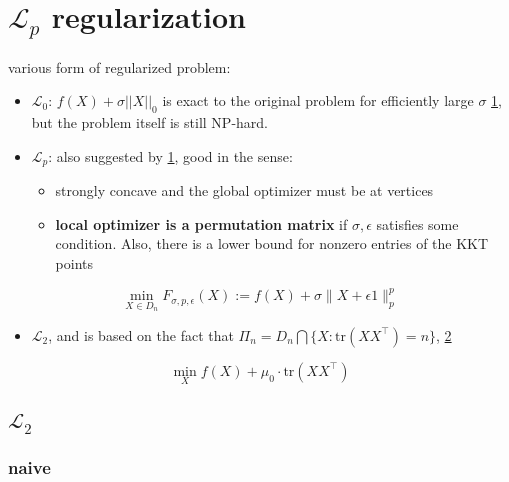 \documentclass[
  10pt,
  a4paper,
,tablecaptionabove
]{scrartcl}
\providecommand{\tightlist}{%
  \setlength{\itemsep}{0pt}\setlength{\parskip}{0pt}}
\begin{document}
\hypertarget{mathscr-l_p-regularization}{%
\section{\texorpdfstring{\(\mathscr L_p\)
regularization}{\textbackslash mathscr L\_p regularization}}\label{mathscr-l_p-regularization}}

various form of regularized problem:

\begin{itemize}
\item
  \(\mathscr L_0\): \(f(X) + \sigma ||X||_0\) is exact to the original
  problem for efficiently large \(\sigma\)
  \protect\hyperlink{ref-jiang_l_p-norm_2016}{1}, but the problem itself
  is still NP-hard.
\item
  \(\mathscr L_p\): also suggested by
  \protect\hyperlink{ref-jiang_l_p-norm_2016}{1}, good in the sense:

  \begin{itemize}
  \tightlist
  \item
    strongly concave and the global optimizer must be at vertices
  \item
    \textbf{local optimizer is a permutation matrix} if
    \(\sigma, \epsilon\) satisfies some condition. Also, there is a
    lower bound for nonzero entries of the KKT points
  \end{itemize}
\end{itemize}

\[\min _{X \in D _{n}} F_{\sigma, p, \epsilon}(X):=f(X)+\sigma\|X+\epsilon 1 \|_{p}^{p}\]

\begin{itemize}
\tightlist
\item
  \(\mathscr L_2\), and is based on the fact that
  \(\Pi_n = D_n \bigcap \{X:\textrm{tr}(XX^\top) = n\}\),
  \protect\hyperlink{ref-xia_efficient_2010}{2}
\end{itemize}

\[\min_Xf(X)+\mu_{0} \cdot \textrm{tr} \left(X X^{\top}\right)\]

\hypertarget{mathscr-l_2}{%
\subsection{\texorpdfstring{\(\mathscr L_2\)}{\textbackslash mathscr L\_2}}\label{mathscr-l_2}}

\hypertarget{naive}{%
\subsubsection{naive}\label{naive}}
\end{document}
